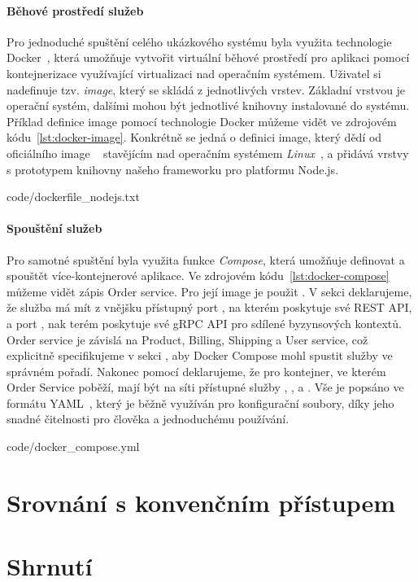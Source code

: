 \paragraph{Běhové prostředí služeb}
Pro jednoduché spuštění celého ukázkového systému byla využita technologie
Docker~\cite{merkel2014docker}, která umožňuje vytvořit virtuální běhové prostředí
pro aplikaci pomocí kontejnerizace využívající virtualizaci nad operačním systémem.
Uživatel si nadefinuje tzv. \textit{image}, který se skládá z jednotlivých vrstev.
Základní vrstvou je operační systém, dalšími mohou být jednotlivé knihovny instalované do systému.
Příklad definice image pomocí technologie Docker můžeme vidět ve zdrojovém
kódu~\ref{lst:docker-image}. Konkrétně se jedná o definici image, který
dědí od oficiálního image ~\cite{dockernodeimage} stavějícím nad operačním systémem \textit{Linux}~\cite{linux},
a přidává vrstvy s prototypem knihovny našeho frameworku pro platformu Node.js.


{code/dockerfile_nodejs.txt}

\paragraph{Spouštění služeb}
Pro samotné spuštění byla využita funkce \textit{Compose}, která umožňuje
definovat a spouštět více-kontejnerové aplikace. Ve zdrojovém kódu~\ref{lst:docker-compose}
můžeme vidět zápis Order service. Pro její image je použit .
V sekci  deklarujeme, že služba má mít z vnějšku přístupný port , na kterém poskytuje své
REST API, a port , nak terém poskytuje své gRPC API pro sdílené byzynsových kontextů. Order service je závislá
na Product, Billing, Shipping a User service, což explicitně specifikujeme v sekci ,
aby Docker Compose mohl spustit služby ve správném pořadí. Nakonec pomocí  deklarujeme,
že pro kontejner, ve kterém Order Service poběží, mají být na síti přístupné služby , ,
 a . Vše je popsáno ve formátu YAML~\cite{ben2005yaml}, který je běžně využíván
pro konfigurační soubory, díky jeho snadné čitelnosti pro člověka a jednoduchému používání.


{code/docker_compose.yml}

\section{Srovnání s konvenčním přístupem}


\section{Shrnutí}


